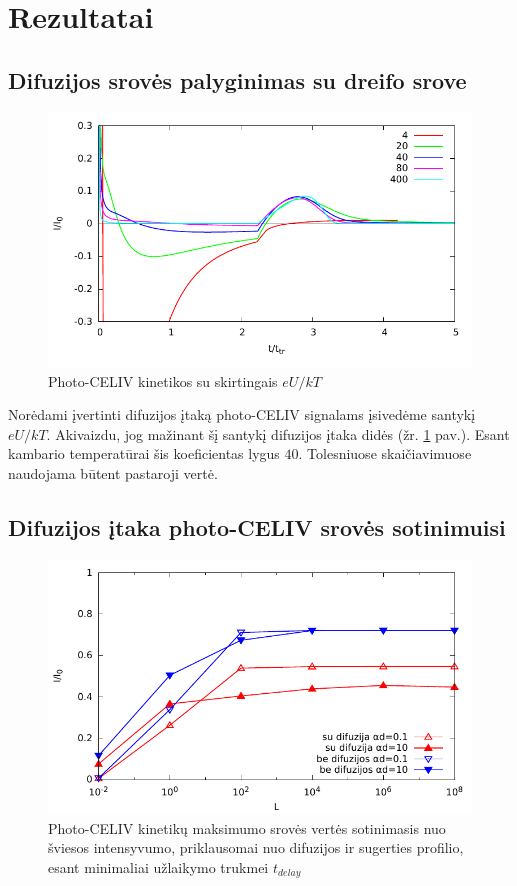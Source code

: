 \section{Rezultatai}

\subsection{Difuzijos srovės palyginimas su dreifo srove}

\begin{figure}[ht]
  \centering
    \includegraphics{./media/pdf/diff_drift.pdf}
  \caption{Photo-CELIV kinetikos su skirtingais $eU/kT$}
  \label{fig:comp}
\end{figure}

Norėdami įvertinti difuzijos įtaką photo-CELIV signalams įsivedėme santykį $eU/kT$. Akivaizdu, jog mažinant šį santykį difuzijos įtaka didės (žr. \ref{fig:comp} pav.). Esant kambario temperatūrai šis koeficientas lygus $40$. Tolesniuose skaičiavimuose naudojama būtent pastaroji vertė.

\subsection{Difuzijos įtaka photo-CELIV srovės sotinimuisi}
\label{page:saturation}
\begin{figure}[ht]
  \centering
    \includegraphics{./media/pdf/semilogsaturation.pdf}
  \caption{Photo-CELIV kinetikų maksimumo srovės vertės sotinimasis nuo šviesos intensyvumo, priklausomai nuo difuzijos ir sugerties profilio, esant minimaliai užlaikymo trukmei $t_{delay}$}
  \label{fig:saturation}
\end{figure}

